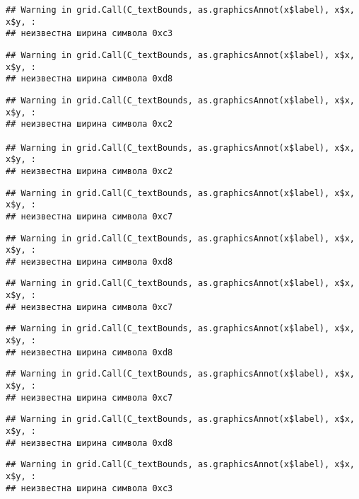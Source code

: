 \documentclass[
]{article}
\begin{document}
\begin{verbatim}
## Warning in grid.Call(C_textBounds, as.graphicsAnnot(x$label), x$x, x$y, :
## неизвестна ширина символа 0xc3
\end{verbatim}

\begin{verbatim}
## Warning in grid.Call(C_textBounds, as.graphicsAnnot(x$label), x$x, x$y, :
## неизвестна ширина символа 0xd8
\end{verbatim}

\begin{verbatim}
## Warning in grid.Call(C_textBounds, as.graphicsAnnot(x$label), x$x, x$y, :
## неизвестна ширина символа 0xc2

## Warning in grid.Call(C_textBounds, as.graphicsAnnot(x$label), x$x, x$y, :
## неизвестна ширина символа 0xc2
\end{verbatim}

\begin{verbatim}
## Warning in grid.Call(C_textBounds, as.graphicsAnnot(x$label), x$x, x$y, :
## неизвестна ширина символа 0xc7
\end{verbatim}

\begin{verbatim}
## Warning in grid.Call(C_textBounds, as.graphicsAnnot(x$label), x$x, x$y, :
## неизвестна ширина символа 0xd8
\end{verbatim}

\begin{verbatim}
## Warning in grid.Call(C_textBounds, as.graphicsAnnot(x$label), x$x, x$y, :
## неизвестна ширина символа 0xc7
\end{verbatim}

\begin{verbatim}
## Warning in grid.Call(C_textBounds, as.graphicsAnnot(x$label), x$x, x$y, :
## неизвестна ширина символа 0xd8
\end{verbatim}

\begin{verbatim}
## Warning in grid.Call(C_textBounds, as.graphicsAnnot(x$label), x$x, x$y, :
## неизвестна ширина символа 0xc7
\end{verbatim}

\begin{verbatim}
## Warning in grid.Call(C_textBounds, as.graphicsAnnot(x$label), x$x, x$y, :
## неизвестна ширина символа 0xd8
\end{verbatim}

\begin{verbatim}
## Warning in grid.Call(C_textBounds, as.graphicsAnnot(x$label), x$x, x$y, :
## неизвестна ширина символа 0xc3
\end{verbatim}
\end{document}
